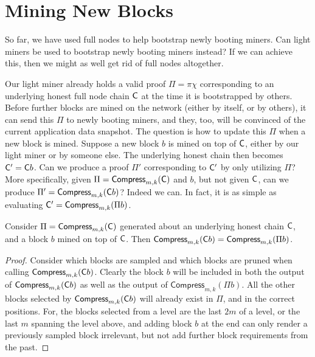 \section{Mining New Blocks}\label{sec.mining13}

So far, we have used full nodes to help bootstrap newly
booting miners. Can light miners be used to bootstrap newly
booting miners instead? If we can achieve this, then we might
as well get rid of full nodes altogether.

Our light miner already holds a valid proof $\Pi = \pi\chi$
corresponding to an underlying honest full node chain $\mathsf{C}$ at
the time it is bootstrapped by others. Before further blocks
are mined on the network (either by itself, or by others),
it can send this $\Pi$ to newly booting miners, and they,
too, will be convinced of the current application data snapshot.
The question is how to update this $\Pi$ when a new block is
mined. Suppose a new block $b$ is mined on top of $\mathsf{C}$,
either by our light miner or by someone else. The underlying
honest chain then becomes $\mathsf{C}' = \mathsf{C} b$. Can we
produce a proof $\Pi'$ corresponding to $\mathsf{C}'$ by only
utilizing $\Pi$? More specifically, given $\Pi = \textsf{Compress}_{m,k}(\mathsf{C})$
and $b$, but not given $\mathsf{C}$, can we produce
$\Pi' = \textsf{Compress}_{m,k}(\mathsf{C} b)$? Indeed we can. In fact,
it is as simple as evaluating
$\mathsf{C}'\allowbreak=\allowbreak\textsf{Compress}_{m,k}(\Pi b)$.

\begin{theorem}[Online]
  Consider $\Pi = \textsf{Compress}_{m,k}(\mathsf{C})$ generated about an underlying honest chain
  $\mathsf{C}$, and a block $b$ mined on top of $\mathsf{C}$. Then
  $\textsf{Compress}_{m,k}(\mathsf{C} b) = \textsf{Compress}_{m,k}(\Pi b)$.
\end{theorem}
\begin{proof}
  Consider which blocks are sampled and which blocks are pruned
  when calling $\textsf{Compress}_{m,k}(\mathsf{C} b)$.
  Clearly the block $b$ will be included in both the output of $\textsf{Compress}_{m,k}(\mathsf{C} b)$
  as well as the output of $\textsf{Compress}_{m,k}(\Pi b)$. All the other blocks selected by
  $\textsf{Compress}_{m,k}(\mathsf{C} b)$ will already exist in $\Pi$, and in
  the correct positions. For, the blocks selected from a level are the last $2m$
  of a level, or the last $m$ spanning the level above, and adding block $b$
  at the end can only render a previously sampled block irrelevant, but not
  add further block requirements from the past.
\end{proof}

